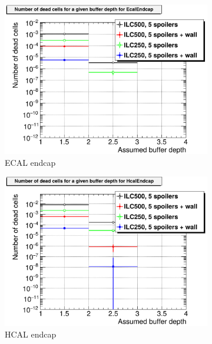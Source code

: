   \begin{figure}[htb]\ContinuedFloat
   \begin{subfigure}[b]{0.49\textwidth}
   \centering
    \includegraphics[width=\textwidth]{Figures/BDS_muons/Occupancy_Comparison_All_layers_deadcells_EcalEndcap.png}
   \caption{ECAL endcap}
   \end{subfigure}
   \hfill
    \begin{subfigure}[b]{0.49\textwidth}
   \centering
    \includegraphics[width=\textwidth]{Figures/BDS_muons/Occupancy_Comparison_All_layers_deadcells_HcalEndcap.png}
   \caption{HCAL endcap}
   \end{subfigure}\\
   \begin{subfigure}[b]{0.49\textwidth}

\end{subfigure}
\end{figure}
